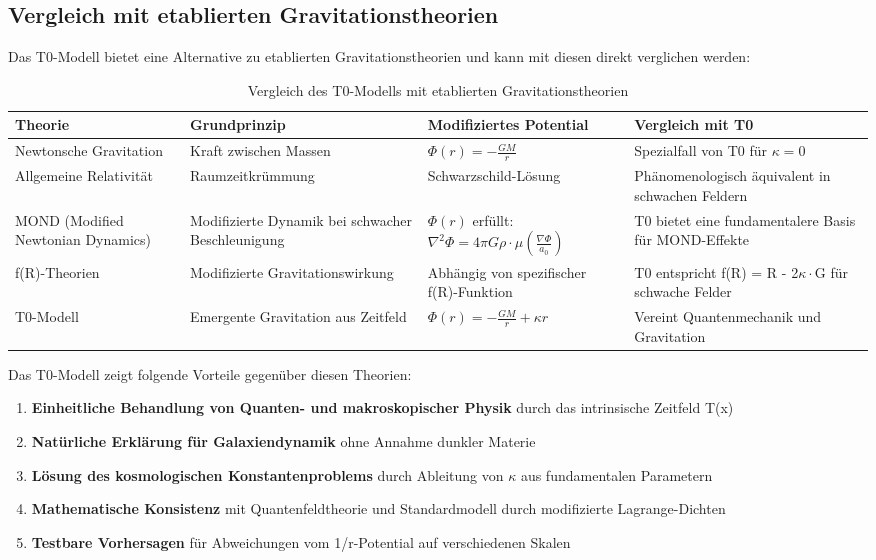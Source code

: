 \documentclass[12pt,a4paper]{article}
\begin{document}
\subsection*{Vergleich mit etablierten Gravitationstheorien}

Das T0-Modell bietet eine Alternative zu etablierten Gravitationstheorien und kann mit diesen direkt verglichen werden:

\begin{table}[H]
	\centering
	\begin{tabular}{p{3cm}p{3cm}p{4cm}p{4cm}}
		\toprule
		\textbf{Theorie} & \textbf{Grundprinzip} & \textbf{Modifiziertes Potential} & \textbf{Vergleich mit T0} \\
		\midrule
		Newtonsche Gravitation & Kraft zwischen Massen & $\Phi(r) = -\frac{GM}{r}$ & Spezialfall von T0 für $\kappa=0$ \\
		Allgemeine Relativität & Raumzeitkrümmung & Schwarzschild-Lösung & Phänomenologisch äquivalent in schwachen Feldern \\
		MOND (Modified Newtonian Dynamics) & Modifizierte Dynamik bei schwacher Beschleunigung & $\Phi(r)$ erfüllt: $\nabla^2\Phi = 4\pi G\rho\cdot\mu(\frac{\nabla\Phi}{a_0})$ & T0 bietet eine fundamentalere Basis für MOND-Effekte \\
		f(R)-Theorien & Modifizierte Gravitationswirkung & Abhängig von spezifischer f(R)-Funktion & T0 entspricht f(R) = R - 2$\kappa\cdot$G für schwache Felder \\
		T0-Modell & Emergente Gravitation aus Zeitfeld & $\Phi(r) = -\frac{GM}{r} + \kappa r$ & Vereint Quantenmechanik und Gravitation \\
		\bottomrule
	\end{tabular}
	\caption{Vergleich des T0-Modells mit etablierten Gravitationstheorien}
	\label{tab:vergleich_theorien}
\end{table}

Das T0-Modell zeigt folgende Vorteile gegenüber diesen Theorien:

\begin{enumerate}
	\item \textbf{Einheitliche Behandlung von Quanten- und makroskopischer Physik} durch das intrinsische Zeitfeld T(x)
	\item \textbf{Natürliche Erklärung für Galaxiendynamik} ohne Annahme dunkler Materie
	\item \textbf{Lösung des kosmologischen Konstantenproblems} durch Ableitung von $\kappa$ aus fundamentalen Parametern
	\item \textbf{Mathematische Konsistenz} mit Quantenfeldtheorie und Standardmodell durch modifizierte Lagrange-Dichten
	\item \textbf{Testbare Vorhersagen} für Abweichungen vom 1/r-Potential auf verschiedenen Skalen
\end{enumerate}
\end{document}

